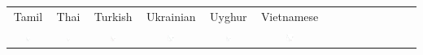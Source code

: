 \documentclass[8pt,letterpaper]{article}
\begin{document}
\begin{tabular}{cccccccccccccc}
Tamil & Thai & Turkish & Ukrainian & Uyghur & Vietnamese \\
\includegraphics[width=0.12\textwidth]{figures/Tamil-listener-surprisal-memory.pdf} & \includegraphics[width=0.12\textwidth]{figures/Thai-Adap-listener-surprisal-memory.pdf} & \includegraphics[width=0.12\textwidth]{figures/Turkish-listener-surprisal-memory.pdf} & \includegraphics[width=0.12\textwidth]{figures/Ukrainian-listener-surprisal-memory.pdf} & \includegraphics[width=0.12\textwidth]{figures/Uyghur-Adap-listener-surprisal-memory.pdf} & \includegraphics[width=0.12\textwidth]{figures/Vietnamese-listener-surprisal-memory.pdf}
\\\end{tabular}
\end{document}
